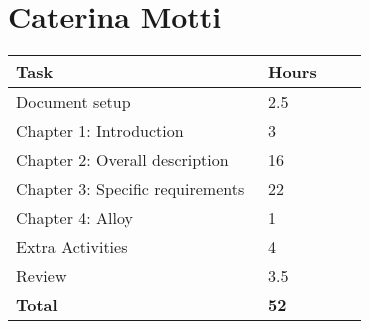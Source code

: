 \section{Caterina Motti}
\begin{center}
	\begin{tabular}{@{}p{0.5\linewidth} p{0.2\linewidth}@{}}
		\hline
		\textbf{Task} & \textbf{Hours} \\ \hline
            Document setup & 2.5 \\ \hline
            Chapter 1: Introduction & 3 \\ \hline
            Chapter 2: Overall description & 16 \\ \hline
            Chapter 3: Specific requirements & 22 \\ \hline
            Chapter 4: Alloy & 1 \\ \hline
            Extra Activities & 4 \\ \hline
            Review & 3.5 \\ \hline
            \hline
            \textbf{Total} & \textbf{52} \\\hline
	\end{tabular}
\end{center}
